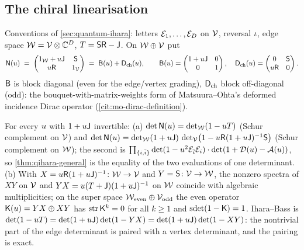 \subsection{The chiral linearisation}

Conventions of \cref{sec:quantum-ihara}: letters $\mathcal E_{1},\dots,\mathcal E_{D}$ on $\mathcal V$, reversal $\iota$,
edge space $\mathcal W = \mathcal V\otimes\mathbb C^{D}$, $T = \mathsf S\mathsf R-\mathsf J$. On $\mathcal W\oplus\mathcal V$ put
\[
  \mathsf N(u) \;=\; \begin{pmatrix} 1_{\mathcal W}+u\mathsf J & \mathsf S\\ u\mathsf R & 1_{\mathcal V}\end{pmatrix}
  \;=\; \mathsf B(u)+\mathsf D_{\mathrm{ch}}(u),\qquad
  \mathsf B(u) = \begin{pmatrix} 1+u\mathsf J & 0\\ 0 & 1\end{pmatrix},\quad
  \mathsf D_{\mathrm{ch}}(u) = \begin{pmatrix} 0 & \mathsf S\\ u\mathsf R & 0\end{pmatrix}.
\]
$\mathsf B$ is block diagonal (even for the edge/vertex grading), $\mathsf D_{\mathrm{ch}}$ block off-diagonal (odd): the
bouquet-with-matrix-weights form of Matsuura--Ohta's deformed incidence Dirac operator (\cref{cit:mo-dirac-definition}).

\begin{proposition}
\label{prop:chiral-linearisation}
For every $u$ with $1+u\mathsf J$ invertible:
(a) $\det\mathsf N(u) = \det_{\mathcal W}(1-uT)$ (Schur complement on $\mathcal V$) and $\det\mathsf N(u) =
\det_{\mathcal W}(1+u\mathsf J)\,\det_{\mathcal V}\bigl(1-u\mathsf R(1+u\mathsf J)^{-1}\mathsf S\bigr)$ (Schur complement on
$\mathcal W$); the second is $\prod_{\{i,\bar{i}\}}\det(1-u^2\mathcal E_{\bar{i}}\mathcal E_{i})\cdot\det(1+\mathcal D(u)-\mathcal A(u))$, so
\cref{thm:qihara-general} is the equality of the two evaluations of one determinant.
(b) With $X = u\mathsf R(1+u\mathsf J)^{-1}\colon\mathcal W\to\mathcal V$ and $Y = \mathsf S\colon\mathcal V\to\mathcal W$, the nonzero
spectra of $XY$ on $\mathcal V$ and $YX = u(T+\mathsf J)(1+u\mathsf J)^{-1}$ on $\mathcal W$ coincide with algebraic
multiplicities; on the super space $\mathcal W_{\mathrm{even}}\oplus\mathcal V_{\mathrm{odd}}$ the even operator
$\mathsf K(u) = YX\oplus XY$ has $\operatorname{str}\mathsf K^k = 0$ for all $k\ge1$ and $\operatorname{sdet}(1-\mathsf K) = 1$. Ihara--Bass
is $\det(1-uT) = \det(1+u\mathsf J)\det(1-YX) = \det(1+u\mathsf J)\det(1-XY)$: the nontrivial part of
the edge determinant is paired with a vertex determinant, and the pairing is exact.
\end{proposition}

